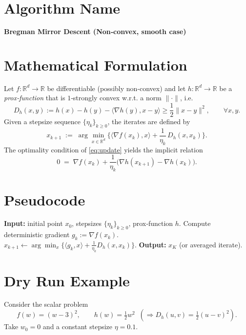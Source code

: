 \documentclass{article}
\newcommand{\breg}[2]{D_h(#1,#2)}
\begin{document}
\section*{Algorithm Name}
\textbf{Bregman Mirror Descent (Non‑convex, smooth case)}

\section*{Mathematical Formulation}
Let $f:\mathbb{R}^d\to \mathbb{R}$ be differentiable (possibly non‑convex) and let $h:\mathbb{R}^d\to\mathbb{R}$ be a \emph{prox‑function} that is $1$‑strongly convex w.r.t. a norm $\|\cdot\|$, i.e.
\[
\breg{x}{y}:=h(x)-h(y)-\langle\nabla h(y),x-y\rangle\ge\frac12\|x-y\|^{2},\qquad\forall x,y.
\]
Given a stepsize sequence $\{\eta_k\}_{k\ge0}$, the iterates are defined by
\begin{equation}\label{eq:update}
x_{k+1}
\;:=\;
\arg\min_{x\in\mathbb{R}^d}
\Big\{\langle\nabla f(x_k),x\rangle+\frac{1}{\eta_k}\,\breg{x}{x_k}\Big\}.
\end{equation}
The optimality condition of \eqref{eq:update} yields the implicit relation
\begin{equation}\label{eq:optcond}
0\;=\;\nabla f(x_k)+\frac{1}{\eta_k}\big(\nabla h(x_{k+1})-\nabla h(x_k)\big). 
\end{equation}

\section*{Pseudocode}
\begin{algorithm}[H]
\caption{Bregman Mirror Descent}
\begin{algorithmic}[1]
\STATE \textbf{Input:} initial point $x_0$, stepsizes $\{\eta_k\}_{k\ge0}$, prox‑function $h$.
\STATE Compute deterministic gradient $g_k:=\nabla f(x_k)$.
\STATE $x_{k+1}\gets\displaystyle\arg\min_x\Big\{\langle g_k,x\rangle+\frac{1}{\eta_k}\breg{x}{x_k}\Big\}$.
\BREAK
\ENDIF
\ENDFOR
\STATE \textbf{Output:} $x_{K}$ (or averaged iterate).
\end{algorithmic}
\end{algorithm}

\section*{Dry Run Example}
Consider the scalar problem 
\[
f(w)=(w-3)^2,\qquad h(w)=\tfrac12 w^2\;\;(\Rightarrow\breg{u}{v}=\tfrac12 (u-v)^2).
\]
Take $w_0=0$ and a constant stepsize $\eta=0.1$.
\end{document}
